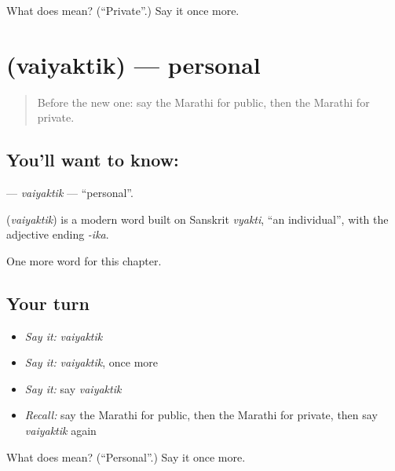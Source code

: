 \begin{tcolorbox}[breakable,colback=teal!4,colframe=teal!35!black,title={Before you move on}]
What does  mean? (\textquotedblleft{}Private\textquotedblright{}.) Say it once more.
\end{tcolorbox}
\section[\texorpdfstring{\mr{वैयक्तिक} (vaiyaktik)}{वैयक्तिक (vaiyaktik)}]{ (vaiyaktik) — personal}

\label{lesson:MR-C206-vaiyaktik}



\begin{quote}
Before the new one: say the Marathi for public, then the Marathi for private.
\end{quote}

\subsection*{You'll want to know: }
\textbf{} — \emph{vaiyaktik} — \textquotedblleft{}personal\textquotedblright{}.

\begin{cousinweb}
\textbf{} (\emph{vaiyaktik}) is a modern word built on Sanskrit \emph{vyakti}, \textquotedblleft{}an individual\textquotedblright{}, with the adjective ending \emph{-ika}.
\end{cousinweb}

\begin{grammarlens}[title={What you've built}]
One more word for this chapter.
\end{grammarlens}

\subsection*{Your turn}
\begin{itemize}
\raggedright
  \item \emph{Say it:} \emph{vaiyaktik}
  \item \emph{Say it:} \emph{vaiyaktik}, once more
  \item \emph{Say it:} say \emph{vaiyaktik}
  \item \emph{Recall:} say the Marathi for public, then the Marathi for private, then say \emph{vaiyaktik} again
\end{itemize}

\begin{tcolorbox}[breakable,colback=teal!4,colframe=teal!35!black,title={Before you move on}]
What does  mean? (\textquotedblleft{}Personal\textquotedblright{}.) Say it once more.
\end{tcolorbox}
